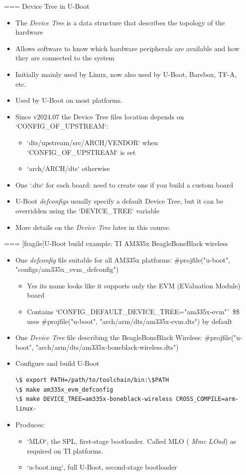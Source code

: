 === {Device Tree in U-Boot}
  \begin{itemize}
  \item The {\em Device Tree} is a data structure that describes the
    topology of the hardware
  \item Allows software to know which hardware peripherals are
    available and how they are connected to the system
  \item Initially mainly used by Linux, now also used by U-Boot,
    Barebox, TF-A, etc.
  \item Used by U-Boot on most platforms.
  \item Since v2024.07 the Device Tree files location depends on `CONFIG_OF_UPSTREAM`:
    \begin{itemize}
      \item `dts/upstream/src/ARCH/VENDOR` when `CONFIG_OF_UPSTREAM` is set
      \item `arch/ARCH/dts` otherwise
    \end{itemize}
  \item One `.dts` for each board: need to create one if you
    build a custom board
  \item U-Boot {\em defconfigs} usually specify a default Device Tree,
    but it can be overridden using the `DEVICE_TREE` variable
  \item More details on the {\em Device Tree} later in this course.
  \end{itemize}


=== [fragile]{U-Boot build example: TI AM335x BeagleBoneBlack wireless}
  \begin{itemize}
  \item One {\em defconfig} file suitable for all AM335x platforms:
    #projfile("u-boot", "configs/am335x_evm_defconfig")
    \begin{itemize}
    \item Yes its name looks like it supports only the EVM (EValuation
      Module) board
    \item Contains `CONFIG_DEFAULT_DEVICE_TREE="am335x-evm"`
      \$\rightarrow\$ uses
      #projfile("u-boot", "arch/arm/dts/am335x-evm.dts") by default
    \end{itemize}
  \item One {\em Device Tree} file describing the BeagleBoneBlack
    Wireless:
    #projfile("u-boot", "arch/arm/dts/am335x-boneblack-wireless.dts")
  \item Configure and build U-Boot
\begin{verbatim}
\$ export PATH=/path/to/toolchain/bin:\$PATH
\$ make am335x_evm_defconfig
\$ make DEVICE_TREE=am335x-boneblack-wireless CROSS_COMPILE=arm-linux-
\end{verbatim}
  \item Produces:
    \begin{itemize}
    \item `MLO`, the SPL, first-stage bootloader. Called MLO ({\em
    Mmc LOad}) as required on TI platforms.
    \item `u-boot.img`, full U-Boot, second-stage bootloader
    \end{itemize}
  \end{itemize}


